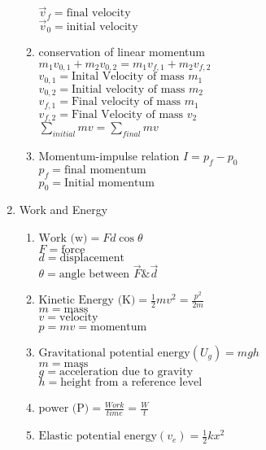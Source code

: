 \documentclass[12pt, letterpaper]{article}
\begin{document}
\begin{enumerate}
\begin{enumerate}
          $\overrightarrow v_f = \text{final velocity}$\\
          $\overrightarrow v_0 = \text{initial velocity}$
          \item conservation of linear momentum\\
          $m_1 v_{0, 1} + m_2 v_{0, 2} = m_1 v_{f, 1} + m_2 v_{f, 2}$\\
          $v_{0, 1} = \text{Inital Velocity of mass $m_1$}$\\
          $v_{0, 2} = \text{Initial velocity of mass $m_2$}$\\
          $v_{f, 1} = \text{Final velocity of mass $m_1$}$\\
          $v_{f, 2} = \text{Final Velocity of mass $v_2$}$\\
          $\sum_{initial} m v = \sum_{final} m v$
          \item Momentum-impulse relation
          $I = p_f - p_0$\\
          $p_f = \text{final momentum}$\\
          $p_0 = \text{Initial momentum}$
        \end{enumerate}
        \item Work and Energy
        \begin{enumerate}
          \item $\text{Work (w)} = F d \cos \theta$\\
          $F = \text{force}$\\
          $d = \text{displacement}$\\
          $\theta = \text{angle between $\overrightarrow F \& \overrightarrow d$}$
          \item $\text{Kinetic Energy (K)} = \frac{1}{2} m v^2 = \frac{p^2}{2m}$\\
          $m = \text{mass}$\\
          $v = \text{velocity}$\\
          $p = mv = \text{momentum}$
          \item $\text{Gravitational potential energy} (U_g) = m g h$\\
          $m = \text{mass}$\\
          $g = \text{acceleration due to gravity}$\\
          $h = \text{height from a reference level}$
          \item $\text{power (P)} = \frac{Work}{time} = \frac{W}{t}$\\
          \item $\text{Elastic potential energy} (v_e) = \frac{1}{2} k x^2$\\

\end{enumerate}
\end{enumerate}
\end{document}
